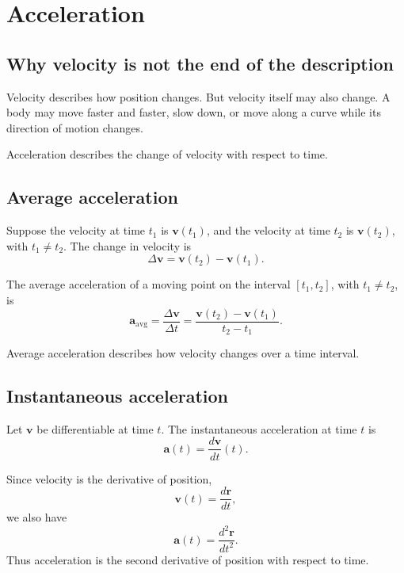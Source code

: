 \section{Acceleration}

\subsection{Why velocity is not the end of the description}

Velocity describes how position changes. But velocity itself may also change. A body may move faster and faster, slow down, or move along a curve while its direction of motion changes.

Acceleration describes the change of velocity with respect to time.

\subsection{Average acceleration}

Suppose the velocity at time \(t_1\) is \(\mathbf{v}(t_1)\), and the velocity at time \(t_2\) is \(\mathbf{v}(t_2)\), with \(t_1\neq t_2\). The change in velocity is
\[
\Delta\mathbf{v}=\mathbf{v}(t_2)-\mathbf{v}(t_1).
\]

\begin{definitionbox}
The average acceleration of a moving point on the interval \([t_1,t_2]\), with \(t_1\neq t_2\), is
\[
\mathbf{a}_{\mathrm{avg}}
=
\frac{\Delta\mathbf{v}}{\Delta t}
=
\frac{\mathbf{v}(t_2)-\mathbf{v}(t_1)}{t_2-t_1}.
\]
\end{definitionbox}

Average acceleration describes how velocity changes over a time interval.

\subsection{Instantaneous acceleration}

\begin{definitionbox}
Let \(\mathbf{v}\) be differentiable at time \(t\). The instantaneous acceleration at time \(t\) is
\[
\mathbf{a}(t)=\frac{d\mathbf{v}}{dt}(t).
\]
\end{definitionbox}

Since velocity is the derivative of position,
\[
\mathbf{v}(t)=\frac{d\mathbf{r}}{dt},
\]
we also have
\[
\mathbf{a}(t)=\frac{d^2\mathbf{r}}{dt^2}.
\]
Thus acceleration is the second derivative of position with respect to time.

